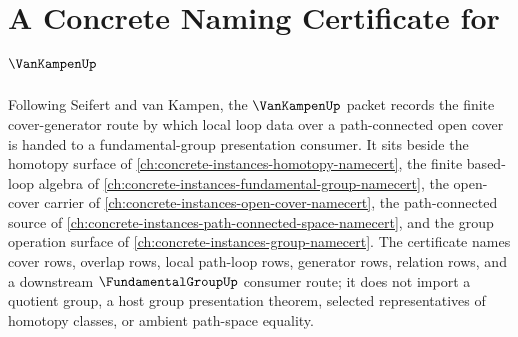 \chapter{A Concrete Naming Certificate for $\VanKampenUp$}
\label{ch:concrete-instances-van-kampen-namecert}

Following Seifert and van Kampen, the $\VanKampenUp$ packet records the finite cover-generator route by which local loop data over a path-connected open cover is handed to a fundamental-group presentation consumer. It sits beside the homotopy surface of \autoref{ch:concrete-instances-homotopy-namecert}, the finite based-loop algebra of \autoref{ch:concrete-instances-fundamental-group-namecert}, the open-cover carrier of \autoref{ch:concrete-instances-open-cover-namecert}, the path-connected source of \autoref{ch:concrete-instances-path-connected-space-namecert}, and the group operation surface of \autoref{ch:concrete-instances-group-namecert}. The certificate names cover rows, overlap rows, local path-loop rows, generator rows, relation rows, and a downstream $\FundamentalGroupUp$ consumer route; it does not import a quotient group, a host group presentation theorem, selected representatives of homotopy classes, or ambient path-space equality.

